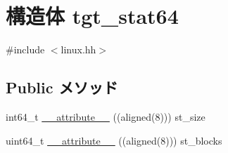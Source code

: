 \hypertarget{structArmLinux32_1_1tgt__stat64}{
\section{構造体 tgt\_\-stat64}
\label{structArmLinux32_1_1tgt__stat64}
}


{\ttfamily \#include $<$linux.hh$>$}\subsection*{Public メソッド}
\begin{DoxyCompactItemize}
\item 
int64\_\-t \hyperlink{structArmLinux32_1_1tgt__stat64_a5dd8bcdc45cdf7b01dfcbcfad5d3bd52}{\_\-\_\-attribute\_\-\_\-} ((aligned(8))) st\_\-size
\item 
uint64\_\-t \hyperlink{structArmLinux32_1_1tgt__stat64_a3c6566c109586774cfae18e3b746a652}{\_\-\_\-attribute\_\-\_\-} ((aligned(8))) st\_\-blocks
\end{DoxyCompactItemize}
